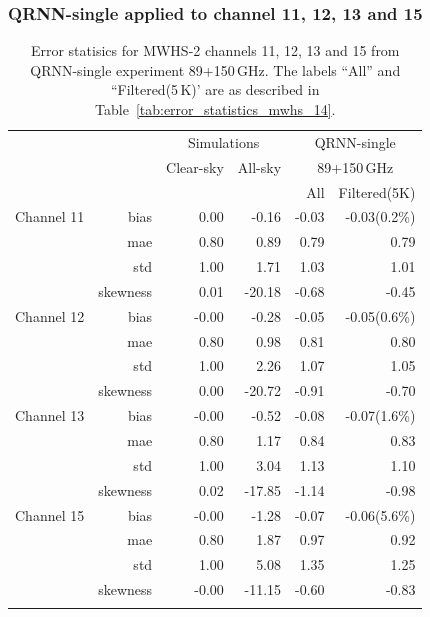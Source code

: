 \documentclass[amt, manuscript]{copernicus}
\begin{document}
\subsubsection{QRNN-single applied to channel 11, 12, 13 and 15}
\label{sec:mwhs_others}
\begin{table}[t]
	\caption{ Error statisics for MWHS-2 channels 11, 12, 13 and 15 from QRNN-single experiment 89+150\,GHz. The labels ``All'' and ``Filtered(5\,K)' are as described in Table~\ref{tab:error_statistics_mwhs_14}.}
	\label{tab:error_statistics_mwhs_others}
	\begin{tabular}{lrrr|rr}
		\tophline
		&&\multicolumn{2}{c|}{Simulations}& \multicolumn{2}{c}{QRNN-single} \\
		\cline{2-6}
		& &  Clear-sky &   All-sky &  \multicolumn{2}{c}{89+150\,GHz}  \\
		&	&		   &			& All & Filtered(5K)\\
		\middlehline
		Channel 11  &   bias     & 0.00 &  -0.16 & -0.03 & -0.03(0.2\%)  \\
				    &	mae      & 0.80 &   0.89 &  0.79 &  0.79  \\
					&	std      & 1.00 &   1.71 &  1.03 &  1.01  \\
					&	skewness & 0.01 & -20.18 & -0.68 & -0.45  \\
		\middlehline
		Channel 12  & bias     & -0.00 &  -0.28 & -0.05 & -0.05(0.6\%)  \\
					& mae      &  0.80 &   0.98 &  0.81 &  0.80  \\
					& std      &  1.00 &   2.26 &  1.07 &  1.05  \\
					& skewness &  0.00 & -20.72 & -0.91 & -0.70  \\
		\middlehline
		Channel 13  & bias     & -0.00 &  -0.52 & -0.08 & -0.07(1.6\%)  \\
					& mae      &  0.80 &   1.17 &  0.84 &  0.83  \\
					& std      &  1.00 &   3.04 &  1.13 &  1.10  \\
					& skewness &  0.02 & -17.85 & -1.14 & -0.98 \\		
		\middlehline
		Channel 15  & bias     & -0.00 &  -1.28 & -0.07 & -0.06(5.6\%)  \\
					& mae      &  0.80 &   1.87 &  0.97 &  0.92 \\
					& std      &  1.00 &   5.08 &  1.35 &  1.25 \\
					& skewness & -0.00 & -11.15 & -0.60 & -0.83  \\ 
		\bottomhline
	\end{tabular}
\end{table}
\end{document}
